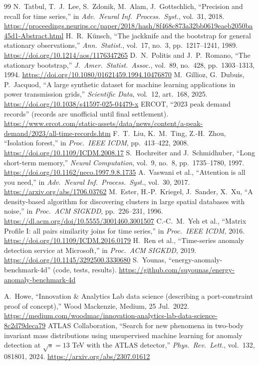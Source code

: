 \documentclass[10pt,twocolumn]{article}
\newif\ifanon \anonfalse
\begin{document}
\begin{thebibliography}{99}
 N.~Tatbul, T.~J.~Lee, S.~Zdonik, M.~Alam, J.~Gottschlich, ``Precision and recall for time series,'' in \emph{Adv.\ Neural Inf.\ Process.\ Syst.}, vol.~31, 2018. \url{https://proceedings.neurips.cc/paper/2018/hash/8f468c873a32bb0619eaeb2050ba45d1-Abstract.html}
 H.~R.~K\"unsch, ``The jackknife and the bootstrap for general stationary observations,'' \emph{Ann.\ Statist.}, vol.~17, no.~3, pp.~1217--1241, 1989. \url{https://doi.org/10.1214/aos/1176347265}
 D.~N.~Politis and J.~P.~Romano, ``The stationary bootstrap,'' \emph{J.\ Amer.\ Statist.\ Assoc.}, vol.~89, no.~428, pp.~1303--1313, 1994. \url{https://doi.org/10.1080/01621459.1994.10476870}
 M.~Gillioz, G.~Dubuis, P.~Jacquod, ``A large synthetic dataset for machine learning applications in power transmission grids,'' \emph{Scientific Data}, vol.~12, art.~168, 2025. \url{https://doi.org/10.1038/s41597-025-04479-x}
 ERCOT, ``2023 peak demand records'' (records are unofficial until final settlement). \url{https://www.ercot.com/static-assets/data/news/content/a-peak-demand/2023/all-time-records.htm}
 F.~T.~Liu, K.~M.~Ting, Z.-H.~Zhou, ``Isolation forest,'' in \emph{Proc.\ IEEE ICDM}, pp.~413--422, 2008. \url{https://doi.org/10.1109/ICDM.2008.17}
 S.~Hochreiter and J.~Schmidhuber, ``Long short-term memory,'' \emph{Neural Computation}, vol.~9, no.~8, pp.~1735--1780, 1997. \url{https://doi.org/10.1162/neco.1997.9.8.1735}
 A.~Vaswani et al., ``Attention is all you need,'' in \emph{Adv.\ Neural Inf.\ Process.\ Syst.}, vol.~30, 2017. \url{https://arxiv.org/abs/1706.03762}
 M.~Ester, H.-P.~Kriegel, J.~Sander, X.~Xu, ``A density-based algorithm for discovering clusters in large spatial databases with noise,'' in \emph{Proc.\ ACM SIGKDD}, pp.~226--231, 1996. \url{https://dl.acm.org/doi/10.5555/3001460.3001507}
 C.-C.~M.~Yeh et al., ``Matrix Profile I: all pairs similarity joins for time series,'' in \emph{Proc.\ IEEE ICDM}, 2016. \url{https://doi.org/10.1109/ICDM.2016.0179}
 H.~Ren et al., ``Time-series anomaly detection service at Microsoft,'' in \emph{Proc.\ ACM SIGKDD}, 2019. \url{https://doi.org/10.1145/3292500.3330680}
 S.~Younas, ``energy-anomaly-benchmark-4d'' (code, tests, results). \url{https://github.com/suyounas/energy-anomaly-benchmark-4d}
\ifanon\else
{} A.~Howe, ``Innovation \& Analytics Lab data science (describing a port-constraint proof of concept),'' Wood Mackenzie, Medium, 25 Jul.\ 2022. \url{https://medium.com/woodmac/innovation-analytics-lab-data-science-8c2d79deca79}
 ATLAS Collaboration, ``Search for new phenomena in two-body invariant mass distributions using unsupervised machine learning for anomaly detection at $\sqrt{s}=13$ TeV with the ATLAS detector,'' \emph{Phys.\ Rev.\ Lett.}, vol.~132, 081801, 2024. \url{https://arxiv.org/abs/2307.01612}
\fi
\end{thebibliography}
\end{document}
